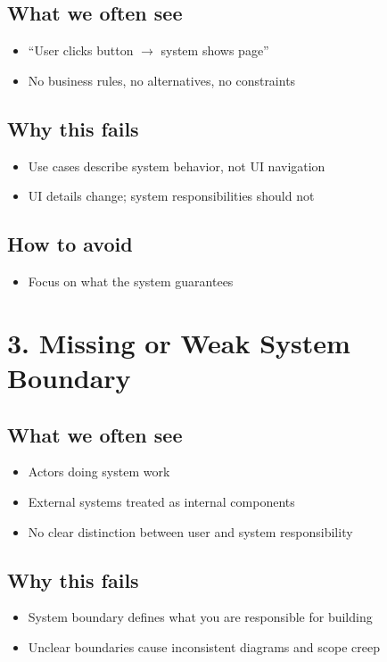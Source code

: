 \documentclass{article}
\begin{document}
\subsection*{What we often see}
\begin{itemize}[noitemsep]
    \item ``User clicks button $\rightarrow$ system shows page''
    \item No business rules, no alternatives, no constraints
\end{itemize}

\subsection*{Why this fails}
\begin{itemize}[noitemsep]
    \item Use cases describe system behavior, not UI navigation
    \item UI details change; system responsibilities should not
\end{itemize}

\subsection*{How to avoid}
\begin{itemize}[noitemsep]
    \item Focus on what the system guarantees
\end{itemize}

\section*{3. Missing or Weak System Boundary}

\subsection*{What we often see}
\begin{itemize}[noitemsep]
    \item Actors doing system work
    \item External systems treated as internal components
    \item No clear distinction between user and system responsibility
\end{itemize}

\subsection*{Why this fails}
\begin{itemize}[noitemsep]
    \item System boundary defines what you are responsible for building
    \item Unclear boundaries cause inconsistent diagrams and scope creep
\end{itemize}
\end{document}
